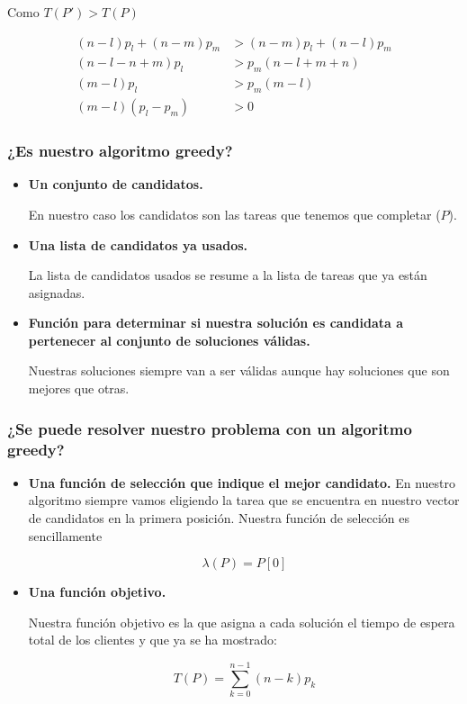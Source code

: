 \documentclass[spanish]{beamer}
\begin{document}
\begin{frame}

  Como $T(P') > T(P)$
  
  \begin{align*}
  (n-l)p_l+(n-m)p_m &> (n-m)p_l + (n-l)p_m \\
  (n-l-n+m)p_l &> p_m(n-l+m+n) \\
  (m-l)p_l &> p_m(m-l) \\
  (m-l)(p_l-p_m) &> 0
\end{align*}
\end{frame}

\begin{frame}\frametitle{¿Es nuestro algoritmo greedy?}


  \begin{itemize}
  \item \textbf{Un conjunto de candidatos.}

    En nuestro caso los candidatos son las tareas que tenemos que completar ($P$).
    \pause
  \item \textbf{Una lista de candidatos ya usados.}

    La lista de candidatos usados se resume a la lista de tareas que ya están asignadas.
    \pause
   
  \item \textbf{Función para determinar si nuestra solución es candidata
      a pertenecer al conjunto de soluciones válidas.}

    Nuestras soluciones siempre van a ser válidas aunque hay
    soluciones que son mejores que otras.
  
  \end{itemize}
  
  \end{frame}

  \begin{frame}\frametitle{¿Se puede resolver nuestro problema con un algoritmo greedy?}


  \begin{itemize}
  \item \textbf{Una función de selección que indique el mejor
      candidato.}  En nuestro algoritmo siempre vamos eligiendo la
    tarea que se encuentra en nuestro vector de candidatos en la
    primera posición. Nuestra función de selección es sencillamente

    \[
      \lambda(P) = P[0]
    \]

    \pause

  \item \textbf{Una función objetivo.}

    Nuestra función objetivo es la que asigna a cada solución el
    tiempo de espera total de los clientes y que ya se ha mostrado:

    \[
      T(P) = \sum_{k=0}^{n-1}(n-k)p_k
    \]
    
  \end{itemize}
    
\end{frame}
\end{document}
